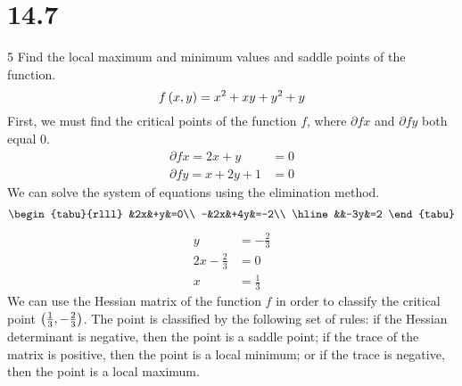 \documentclass[12pt]{article}
\begin{document}
\section{14.7}{5}
Find the local maximum and minimum values and saddle points of the function.
%
\begin{equation*}
f\left({x,y}\right)=x^2+xy+y^2+y
\end{equation*}
%
First, we must find the critical points of the function $f$, where $\partial{f}{x}$ and $\partial{f}{y}$ both equal $0$.
%
\begin{align*}
\partial{f}{x}=2x+y&=0\\
\partial{f}{y}=x+2y+1&=0
\end{align*}
%
We can solve the system of equations using the elimination method.
%
\begin{gather*}
\begin{tabu}{rlll}
&2x&+y&=0\\
-&2x&+4y&=-2\\
\hline
&&-3y&=2
\end{tabu}
\end{gather*}
\begin{align*}
y&=-\frac{2}{3}\\
2x-\frac{2}{3}&=0\\
x&=\frac{1}{3}
\end{align*}
%
We can use the Hessian matrix of the function $f$ in order to classify the critical point $\left({\frac{1}{3},-\frac{2}{3}}\right)$.
The point is classified by the following set of rules: if the Hessian determinant is negative, then the point is a saddle
point; if the trace of the matrix is positive, then the point is a local minimum; or if the trace is negative, then the point
is a local maximum.
%
\end{document}
